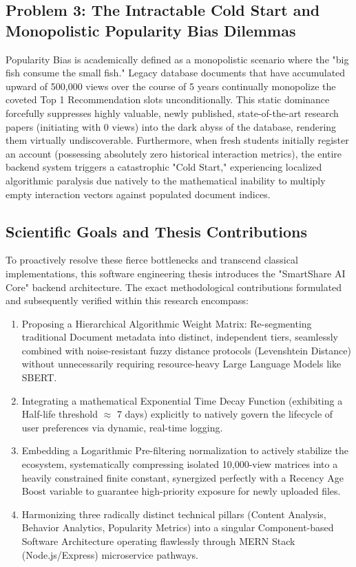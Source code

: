 \documentclass[journal]{IEEEtran}
\begin{document}
\subsection{Problem 3: The Intractable Cold Start and Monopolistic Popularity Bias Dilemmas}

Popularity Bias is academically defined as a monopolistic scenario where the "big fish consume the small fish." 
Legacy database documents that have accumulated upward of 500,000 views over the course of 5 years 
continually monopolize the coveted Top 1 Recommendation slots unconditionally. 
This static dominance forcefully suppresses highly valuable, newly published, state-of-the-art research papers (initiating with 0 views) 
into the dark abyss of the database, rendering them virtually undiscoverable. 
Furthermore, when fresh students initially register an account (possessing absolutely zero historical interaction metrics), 
the entire backend system triggers a catastrophic "Cold Start," 
experiencing localized algorithmic paralysis due natively to the mathematical inability to multiply empty interaction vectors against populated document indices.

\subsection{Scientific Goals and Thesis Contributions}

To proactively resolve these fierce bottlenecks and transcend classical implementations, 
this software engineering thesis introduces the "SmartShare AI Core" backend architecture. 
The exact methodological contributions formulated and subsequently verified within this research encompass:
\begin{enumerate}
    \item Proposing a Hierarchical Algorithmic Weight Matrix: Re-segmenting traditional Document metadata into distinct, independent tiers, seamlessly combined with noise-resistant fuzzy distance protocols (Levenshtein Distance) without unnecessarily requiring resource-heavy Large Language Models like SBERT.
    \item Integrating a mathematical Exponential Time Decay Function (exhibiting a Half-life threshold $\approx$ 7 days) explicitly to natively govern the lifecycle of user preferences via dynamic, real-time logging.
    \item Embedding a Logarithmic Pre-filtering normalization to actively stabilize the ecosystem, systematically compressing isolated 10,000-view matrices into a heavily constrained finite constant, synergized perfectly with a Recency Age Boost variable to guarantee high-priority exposure for newly uploaded files.
    \item Harmonizing three radically distinct technical pillars (Content Analysis, Behavior Analytics, Popularity Metrics) into a singular Component-based Software Architecture operating flawlessly through MERN Stack (Node.js/Express) microservice pathways.
\end{enumerate}
\end{document}
